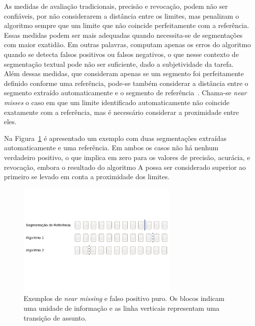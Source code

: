 As medidas de avaliação tradicionais, precisão e revocação, podem não ser confiáveis, por não considerarem a distância entre os limites, mas penalizam o algoritmo sempre que um limite que não coincide perfeitamente com a referência. Essas medidas podem ser mais adequadas quando necessita-se de segmentações com maior exatidão. Em outras palavras, computam apenas os erros do algoritmo quando se detecta falsos positivos ou falsos negativos, o que nesse contexto de segmentação textual pode não ser suficiente, dado a subjetividade da tarefa. Além dessas medidas, que consideram apenas se um segmento foi perfeitamente definido conforme uma referência, pode-se também considerar a distância entre o segmento extraído automaticamente e o segmento de referência~\cite{Kern2009}. Chama-se \textit{near misses} o caso em que um limite identificado automaticamente não coincide exatamente com a referência, mas é necessário considerar a proximidade entre eles.

Na Figura~\ref{fig:exemplosegmentacaozoom} é apresentado um exemplo com duas segmentações extraídas automaticamente e uma referência. Em ambos os casos não há nenhum verdadeiro positivo, o que implica em zero para os valores de precisão, acurácia, e revocação, embora o resultado do algoritmo A possa ser considerado superior ao primeiro se levado em conta a proximidade dos limites.

  \begin{figure}[!h]

	\centering
	\includegraphics[trim={ 0 180 0 180 },clip,page=1,width=0.7\textwidth]{conteudo/capitulos/figs/near-missing.pdf}
	\caption{Exemplos de \textit{near missing} e falso positivo puro. Os blocos indicam uma unidade de informação e as linha verticais representam uma transição de assunto. }
	\label{fig:exemplosegmentacaozoom}

  \end{figure}
  



